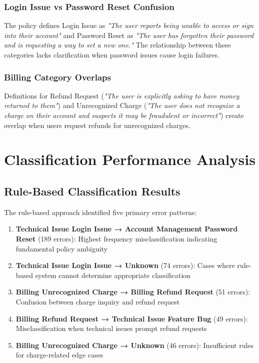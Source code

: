 \documentclass[11pt, a4paper]{article}
\begin{document}
\subsubsection{Login Issue vs Password Reset Confusion}
The policy defines Login Issue as \textit{"The user reports being unable to access or sign into their account"} and Password Reset as \textit{"The user has forgotten their password and is requesting a way to set a new one."} The relationship between these categories lacks clarification when password issues cause login failures.

\subsubsection{Billing Category Overlaps}
Definitions for Refund Request (\textit{"The user is explicitly asking to have money returned to them"}) and Unrecognized Charge (\textit{"The user does not recognize a charge on their account and suspects it may be fraudulent or incorrect"}) create overlap when users request refunds for unrecognized charges.

\section{Classification Performance Analysis}

\subsection{Rule-Based Classification Results}

The rule-based approach identified five primary error patterns:

\begin{enumerate}
\item \textbf{Technical Issue Login Issue → Account Management Password Reset} (189 errors): Highest frequency misclassification indicating fundamental policy ambiguity
\item \textbf{Technical Issue Login Issue → Unknown} (74 errors): Cases where rule-based system cannot determine appropriate classification
\item \textbf{Billing Unrecognized Charge → Billing Refund Request} (51 errors): Confusion between charge inquiry and refund request
\item \textbf{Billing Refund Request → Technical Issue Feature Bug} (49 errors): Misclassification when technical issues prompt refund requests
\item \textbf{Billing Unrecognized Charge → Unknown} (46 errors): Insufficient rules for charge-related edge cases
\end{enumerate}
\end{document}
